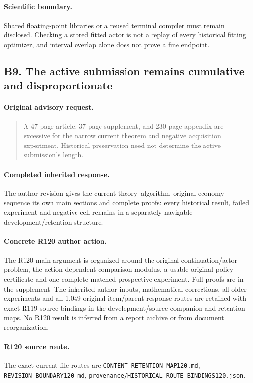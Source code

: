 \paragraph{Scientific boundary.}
Shared floating-point libraries or a reused terminal compiler must remain disclosed. Checking a stored fitted actor is not a replay of every historical fitting optimizer, and interval overlap alone does not prove a fine endpoint.

\subsection{B9. The active submission remains cumulative and disproportionate}
\label{response120:B9}
\paragraph{Original advisory request.}
\begin{quote}
A 47-page article, 37-page supplement, and 230-page appendix are excessive for the narrow current theorem and negative acquisition experiment. Historical preservation need not determine the active submission's length.
\end{quote}
\paragraph{Completed inherited response.}
The author revision gives the current theory--algorithm--original-economy sequence its own main sections and complete proofs; every historical result, failed experiment and negative cell remains in a separately navigable development/retention structure.
\paragraph{Concrete R120 author action.}
The R120 main argument is organized around the original continuation/actor problem, the action-dependent comparison modulus, a usable original-policy certificate and one complete matched prospective experiment. Full proofs are in the supplement. The inherited author inputs, mathematical corrections, all older experiments and all 1,049 original item/parent response routes are retained with exact R119 source bindings in the development/source companion and retention maps. No R120 result is inferred from a report archive or from document reorganization.
\paragraph{R120 source route.}
The exact current file routes are \nolinkurl{CONTENT_RETENTION_MAP120.md}, \nolinkurl{REVISION_BOUNDARY120.md}, \nolinkurl{provenance/HISTORICAL_ROUTE_BINDINGS120.json}.
